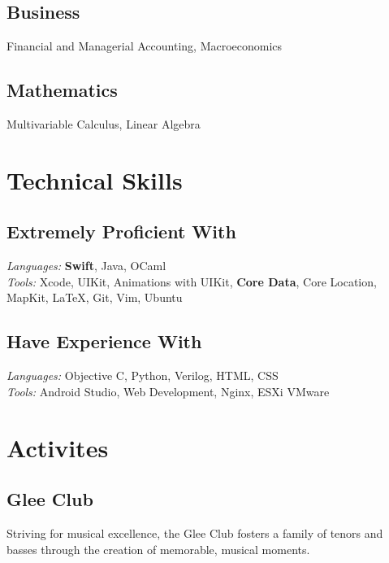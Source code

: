 \documentclass[]{deedy-resume-openfont}
\let\sectionold\section
\renewcommand{\section}[1]{
	\sectionold{\textcolor{sectiontitlecolor}{#1}}
}
\begin{document}
\begin{minipage}[t]{0.33\textwidth}
\subsection{Business}
Financial and Managerial Accounting, Macroeconomics
\sectionsep

\subsection{Mathematics}
Multivariable Calculus, Linear Algebra


\sectionsep


\section{Technical Skills}
\subsection{Extremely Proficient With}
\textit{Languages:} \textbf{Swift}, Java, OCaml \\
\textit{Tools:} Xcode, UIKit, Animations with UIKit, \textbf{Core Data}, Core Location, MapKit, \LaTeX{}, Git, Vim, Ubuntu
\sectionsep
\subsection{Have Experience With}
\textit{Languages:} Objective C, Python, Verilog, HTML, CSS \\
\textit{Tools:} Android Studio, Web Development, Nginx, ESXi VMware
\sectionsep

\section{Activites}
\subsection{Glee Club}
Striving for musical excellence, the Glee Club fosters a family of tenors and basses through the creation of memorable, musical moments.

%
%

\end{minipage} 
\hfill
\end{document}
